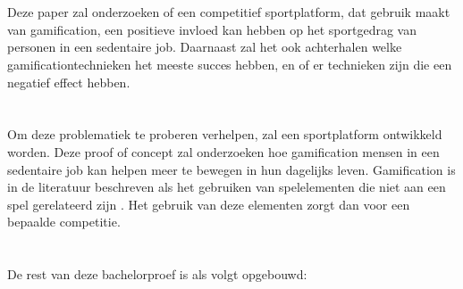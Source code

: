 \section{}%
\label{sec:onderzoeksvraag}


Deze paper zal onderzoeken of een competitief sportplatform, dat gebruik maakt van gamification, een positieve invloed kan hebben
op het sportgedrag van personen in een sedentaire job. Daarnaast zal het ook achterhalen welke gamificationtechnieken  het meeste succes hebben, en of er technieken zijn die een negatief effect hebben.

\section{}%
\label{sec:onderzoeksdoelstelling}

Om deze problematiek te proberen verhelpen, zal een sportplatform ontwikkeld worden. Deze proof of concept zal onderzoeken hoe gamification mensen in een sedentaire job kan helpen meer te bewegen in hun dagelijks leven. Gamification is in de literatuur beschreven als het gebruiken van spelelementen die niet aan een spel gerelateerd zijn \autocite{Gaalen2020}. Het gebruik van deze elementen zorgt dan voor een bepaalde competitie.


\section{}%
\label{sec:opzet-bachelorproef}

De rest van deze bachelorproef is als volgt opgebouwd:


